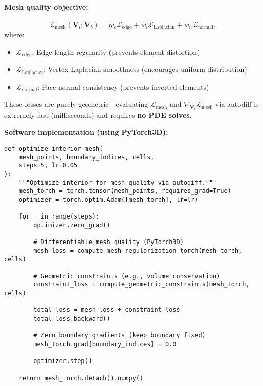 \documentclass{article}
\begin{document}
\paragraph{Mesh quality objective:}
\begin{equation}
    \mathcal{L}_{\text{mesh}}(\mathbf{V}_i; \mathbf{V}_b) = w_e \mathcal{L}_{\text{edge}} + w_l \mathcal{L}_{\text{Laplacian}} + w_n \mathcal{L}_{\text{normal}},
\end{equation}
where:
\begin{itemize}
    \item $\mathcal{L}_{\text{edge}}$: Edge length regularity (prevents element distortion)
    \item $\mathcal{L}_{\text{Laplacian}}$: Vertex Laplacian smoothness (encourages uniform distribution)
    \item $\mathcal{L}_{\text{normal}}$: Face normal consistency (prevents inverted elements)
\end{itemize}

These losses are purely geometric—evaluating $\mathcal{L}_{\text{mesh}}$ and $\nabla_{\mathbf{V}_i} \mathcal{L}_{\text{mesh}}$ via autodiff is extremely fast (milliseconds) and requires \textbf{no PDE solves}.

\textbf{Software implementation (using PyTorch3D):}
\begin{verbatim}
def optimize_interior_mesh(
    mesh_points, boundary_indices, cells,
    steps=5, lr=0.05
):
    """Optimize interior for mesh quality via autodiff."""
    mesh_torch = torch.tensor(mesh_points, requires_grad=True)
    optimizer = torch.optim.Adam([mesh_torch], lr=lr)

    for _ in range(steps):
        optimizer.zero_grad()

        # Differentiable mesh quality (PyTorch3D)
        mesh_loss = compute_mesh_regularization_torch(mesh_torch, cells)

        # Geometric constraints (e.g., volume conservation)
        constraint_loss = compute_geometric_constraints(mesh_torch, cells)

        total_loss = mesh_loss + constraint_loss
        total_loss.backward()

        # Zero boundary gradients (keep boundary fixed)
        mesh_torch.grad[boundary_indices] = 0.0

        optimizer.step()

    return mesh_torch.detach().numpy()
\end{verbatim}
\end{document}
